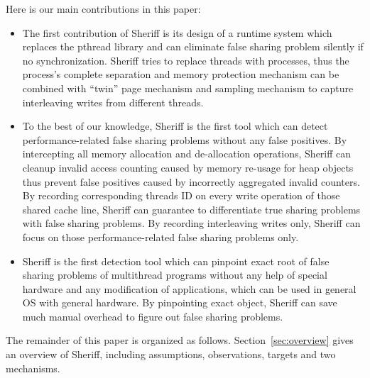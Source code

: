 
Here is our main contributions in this paper:
\begin{itemize}
\item The first contribution of Sheriff is its design of a runtime system which replaces 
the pthread library and can eliminate false sharing problem silently if no synchronization.
Sheriff tries to replace threads with processes, thus the process's 
complete separation and memory protection mechanism can be combined with
``twin'' page mechanism and sampling mechanism to capture interleaving writes from different threads.
 
\item
To the best of our knowledge, Sheriff is the first tool which can detect performance-related false sharing problems 
without any false positives.
By intercepting all memory allocation and de-allocation operations, Sheriff can cleanup  
invalid access counting caused by memory re-usage for heap objects thus prevent false positives caused by incorrectly
aggregated invalid counters.
By recording corresponding threads ID on every write operation of those shared cache line, Sheriff can 
guarantee to differentiate true sharing problems with false sharing problems. 
By recording interleaving writes only, Sheriff can focus on those performance-related false sharing problems only. 

\item 
Sheriff is the first detection tool which can pinpoint exact root of false sharing problems of multithread programs
without any help of special hardware and any modification of applications, 
which can be used in general OS with general hardware.
By pinpointing exact object, Sheriff can save much manual overhead to figure out false sharing problems. 


\end{itemize}
The remainder of this paper is organized as follows. Section~\ref{sec:overview} gives an overview
of Sheriff, including assumptions, observations, targets and two mechanisms. 
